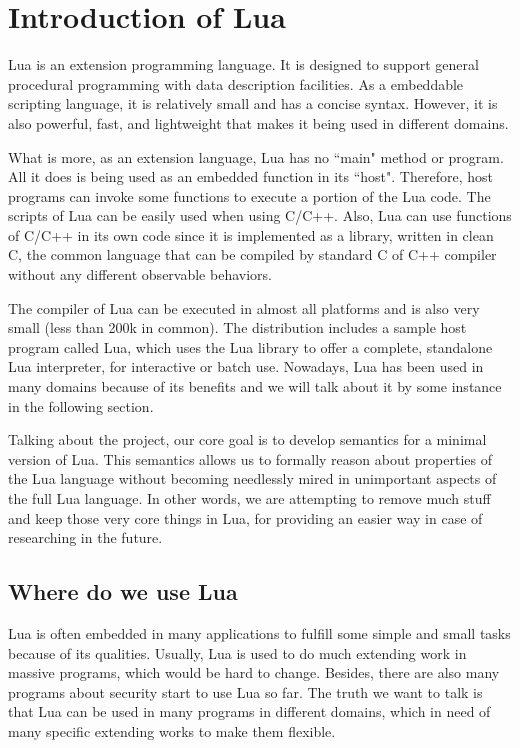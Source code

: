 \chapter{Introduction of Lua}
Lua is an extension programming language. It is designed to support general procedural programming with data description facilities. As a embeddable scripting language, it is relatively small and has a concise syntax. However, it is also powerful, fast, and lightweight that makes it being used in different domains.

What is more, as an extension language, Lua has no ``main" method or program. All it does is being used as an embedded function in its ``host". Therefore, host programs can invoke some functions to execute a portion of the Lua code. The scripts of Lua can be easily used when using C/C++. Also, Lua can use functions of C/C++ in its own code since it is implemented as a library, written in clean C\cite{CLC}, the common language that can be compiled by standard C of C++ compiler without any different observable behaviors.

The compiler of Lua can be executed in almost all platforms and is also very small (less than 200k in common). The distribution includes a sample host program called Lua, which uses the Lua library to offer a complete, standalone Lua interpreter, for interactive or batch use. Nowadays, Lua has been used in many domains because of its benefits and we will talk about it by some instance in the following section.

Talking about the project, our core goal is to develop semantics for a minimal version of Lua. This semantics allows us to formally reason about properties of the Lua language without becoming needlessly mired in unimportant aspects of the full Lua language. In other words, we are attempting to remove much stuff and keep those very core things in Lua, for providing an easier way in case of researching in the future.

\section{Where do we use Lua}
Lua is often embedded in many applications to fulfill some simple and small tasks because of its qualities. Usually, Lua is used to do much extending work in massive programs, which would be hard to change. Besides, there are also many programs about security start to use Lua so far. The truth we want to talk is that Lua can be used in many programs in different domains, which in need of many specific extending works to make them flexible. 

